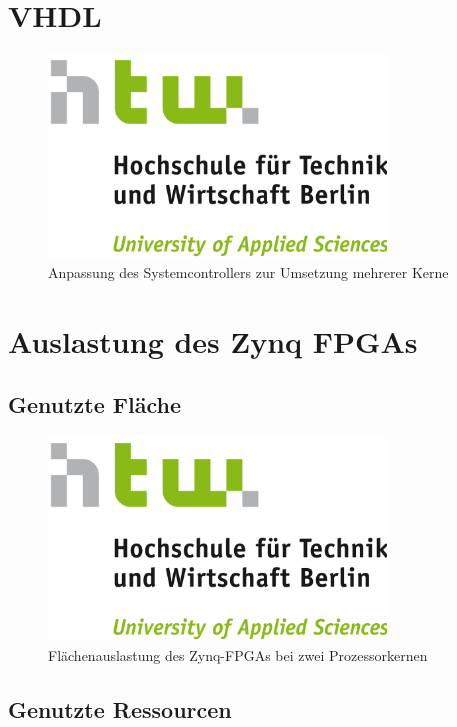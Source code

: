 \documentclass[11pt,a4paper,titlepage]{article}
\begin{document}
\section{VHDL}

\begin{figure}[H]
\centering
\includegraphics[width=0.8\textwidth]{images/htw_hochschule.png}
\caption{Anpassung des Systemcontrollers zur Umsetzung mehrerer Kerne}
\end{figure}

\section{Auslastung des Zynq FPGAs}

\subsection{Genutzte Fläche}

\begin{figure}[H]
\centering
\includegraphics[width=0.8\textwidth]{images/htw_hochschule.png}
\caption{Flächenauslastung des Zynq-FPGAs bei zwei Prozessorkernen}
\end{figure}

\subsection{Genutzte Ressourcen}
\end{document}
